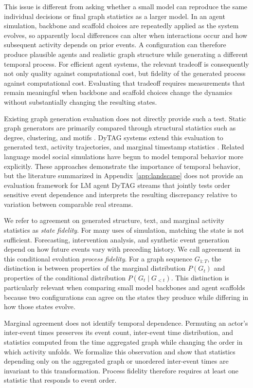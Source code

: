 \documentclass{article}
\begin{document}
This issue is different from asking whether a small model can reproduce the
same individual decisions or final graph statistics as a larger model. In an
agent simulation, backbone and scaffold choices are repeatedly applied as the
system evolves, so apparently local differences can alter when interactions
occur and how subsequent activity depends on prior events. A configuration can
therefore produce plausible agents and realistic graph structure while
generating a different temporal process. For efficient agent systems, the
relevant tradeoff is consequently not only quality against computational cost,
but fidelity of the generated process against computational cost. Evaluating
that tradeoff requires measurements that remain meaningful when backbone and
scaffold choices change the dynamics without substantially changing the
resulting states.

Existing graph generation evaluation does not directly provide such a test.
Static graph generators are primarily compared through structural statistics
such as degree, clustering, and motifs
\citep{you2018graphrnn,liao2019gran,obray2022evaluation}. DyTAG systems extend
this evaluation to generated text, activity trajectories, and marginal
timestamp statistics \citep{ji2025gag,peng2025gdgb,ji2026graphia}. Related
language model social simulations have begun to model temporal behavior more
explicitly. These approaches
demonstrate the importance of temporal behavior, but the literature summarized
in Appendix~\ref{app:landscape} does not provide an evaluation framework for
LM agent DyTAG streams that jointly tests order sensitive event dependence and
interprets the resulting discrepancy relative to variation between comparable
real streams.

We refer to agreement on generated structure, text, and marginal activity
statistics as \emph{state fidelity}. For many uses of simulation, matching the
state is not sufficient. Forecasting, intervention analysis, and synthetic
event generation depend on how future events vary with preceding history. We
call agreement in this conditional evolution \emph{process fidelity}. For a
graph sequence $G_{1:T}$, the distinction is between properties of the
marginal distribution $P(G_t)$ and properties of the conditional distribution
$P(G_t\mid G_{<t})$. This distinction is particularly relevant when comparing
small model backbones and agent scaffolds because two configurations can agree
on the states they produce while differing in how those states evolve.

Marginal agreement does not identify temporal dependence. Permuting an actor's
inter-event times preserves its event count, inter-event time distribution,
and statistics computed from the time aggregated graph while changing the
order in which activity unfolds. We formalize this observation and show that
statistics depending only on the aggregated graph or unordered inter-event
times are invariant to this transformation. Process fidelity therefore
requires at least one statistic that responds to event order.
\end{document}
